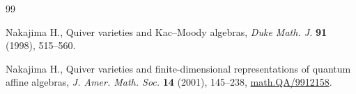 %
\begin{thebibliography}{99}

Nakajima H., Quiver varieties and Kac--Moody algebras, {\it Duke Math. J.}
  \textbf{91} (1998), 515--560. %

Nakajima H., Quiver varieties and f\/inite-dimensional representations of
  quantum af\/f\/ine algebras, {\it J. Amer. Math. Soc.} \textbf{14} (2001),
  145--238, \href{http://arxiv.org/abs/math.QA/9912158}{math.QA/9912158}. %

\end{thebibliography}
